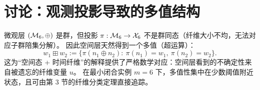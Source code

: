 \section{讨论：观测投影导致的多值结构}

微观层 $(\mathcal{M}_6,\oplus)$ 是群，但投影 $\pi:\mathcal{M}_6\to\mathcal{X}_6$ 不是群同态（纤维大小不均，无法对应子群陪集分解）。
因此空间层天然得到一个多值（超运算）：
$$
w_1\boxplus w_2:=\{\pi(n_1\oplus n_2):\ \pi(n_1)=w_1,\ \pi(n_2)=w_2\}.
$$
这为“空间态 + 时间纤维”的解释提供了严格数学对应：空间层看到的不确定性来自被遗忘的纤维变量 $u$。
在最小闭合实例 $m=6$ 下，多值性集中在少数阈值附近状态，且可由第 3 节的纤维分类定理直接追踪。

